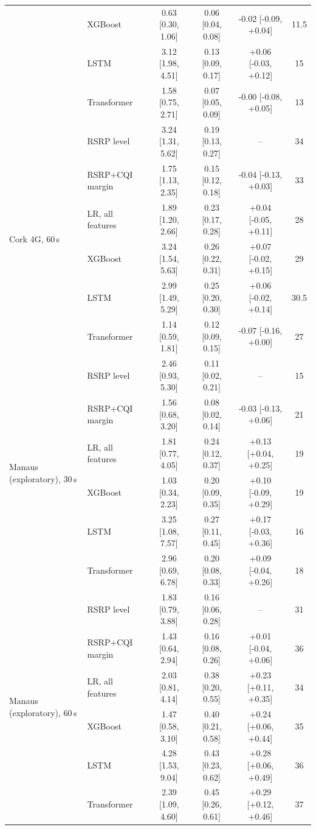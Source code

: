 \documentclass[preprint,review,12pt]{elsarticle}
\begin{document}
\begin{table}[!htbp]
{\begin{tabular}{llcccc}
 & XGBoost & 0.63 [0.30, 1.06] & 0.06 [0.04, 0.08] & -0.02 [-0.09, +0.04] & 11.5 \\
 & LSTM & 3.12 [1.98, 4.51] & 0.13 [0.09, 0.17] & +0.06 [-0.03, +0.12] & 15 \\
 & Transformer & 1.58 [0.75, 2.71] & 0.07 [0.05, 0.09] & -0.00 [-0.08, +0.05] & 13 \\
\midrule
\multirow{6}{*}{Cork 4G, 60\,s} & RSRP level & 3.24 [1.31, 5.62] & 0.19 [0.13, 0.27] & -- & 34 \\
 & RSRP+CQI margin & 1.75 [1.13, 2.35] & 0.15 [0.12, 0.18] & -0.04 [-0.13, +0.03] & 33 \\
 & LR, all features & 1.89 [1.20, 2.66] & 0.23 [0.17, 0.28] & +0.04 [-0.05, +0.11] & 28 \\
 & XGBoost & 3.24 [1.54, 5.63] & 0.26 [0.22, 0.31] & +0.07 [-0.02, +0.15] & 29 \\
 & LSTM & 2.99 [1.49, 5.29] & 0.25 [0.20, 0.30] & +0.06 [-0.02, +0.14] & 30.5 \\
 & Transformer & 1.14 [0.59, 1.81] & 0.12 [0.09, 0.15] & -0.07 [-0.16, +0.00] & 27 \\
\midrule
\multirow{6}{*}{Manaus (exploratory), 30\,s} & RSRP level & 2.46 [0.93, 5.30] & 0.11 [0.02, 0.21] & -- & 15 \\
 & RSRP+CQI margin & 1.56 [0.68, 3.20] & 0.08 [0.02, 0.14] & -0.03 [-0.13, +0.06] & 21 \\
 & LR, all features & 1.81 [0.77, 4.05] & 0.24 [0.12, 0.37] & +0.13 [+0.04, +0.25] & 19 \\
 & XGBoost & 1.03 [0.34, 2.23] & 0.20 [0.09, 0.35] & +0.10 [-0.09, +0.29] & 19 \\
 & LSTM & 3.25 [1.08, 7.57] & 0.27 [0.11, 0.45] & +0.17 [-0.03, +0.36] & 16 \\
 & Transformer & 2.96 [0.69, 6.78] & 0.20 [0.08, 0.33] & +0.09 [-0.04, +0.26] & 18 \\
\midrule
\multirow{6}{*}{Manaus (exploratory), 60\,s} & RSRP level & 1.83 [0.79, 3.88] & 0.16 [0.06, 0.28] & -- & 31 \\
 & RSRP+CQI margin & 1.43 [0.64, 2.94] & 0.16 [0.08, 0.26] & +0.01 [-0.04, +0.06] & 36 \\
 & LR, all features & 2.03 [0.81, 4.14] & 0.38 [0.20, 0.55] & +0.23 [+0.11, +0.35] & 34 \\
 & XGBoost & 1.47 [0.58, 3.10] & 0.40 [0.21, 0.58] & +0.24 [+0.06, +0.44] & 35 \\
 & LSTM & 4.28 [1.53, 9.04] & 0.43 [0.23, 0.62] & +0.28 [+0.06, +0.49] & 36 \\
 & Transformer & 2.39 [1.09, 4.60] & 0.45 [0.26, 0.61] & +0.29 [+0.12, +0.46] & 37 \\
\bottomrule
\end{tabular}}
\end{table}
\end{document}
